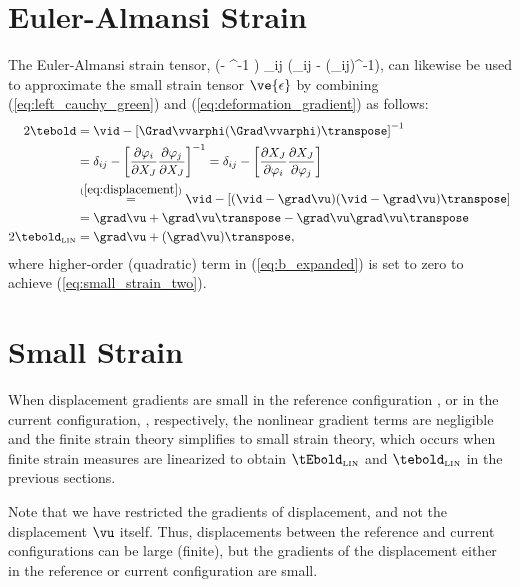 \section{Euler-Almansi Strain}
The Euler-Almansi strain tensor,
\be
 \tebold 
 \half (\vid - \tbbold^{-1} )
 \;\; \Longleftrightarrow \;\;
 \te_{ij} 
 \half \left(\delta_{ij} - (\tb_{ij})^{-1}\right),
\ee
can likewise be used to approximate the small strain tensor
$\ve{\epsilon}$ by combining (\ref{eq:left_cauchy_green}) and
(\ref{eq:deformation_gradient}) as follows:
\begin{align}
 2 \tebold &=
     \vid - \left[ \Grad \vvarphi 
     (\Grad \vvarphi)\transpose \right]^{-1} \nonumber \\
     &= 
     \delta_{ij} 
       - \left[ \frac{\partial \varphi_i}{\partial X_J}
                \frac{\partial \varphi_j}{\partial X_J}
         \right]^{-1} %
     =
      \delta_{ij} 
       - \left[ \frac{\partial X_J}{\partial \varphi_i}
                \frac{\partial X_J}{\partial \varphi_j}
         \right] 
	    \nonumber \\ 
     &\overset{(\ref{eq:displacement})}{=}
      \vid 
       - \left[
                (\vid - \grad \vu) (\vid - \grad \vu)\transpose
         \right]
	   \nonumber \\ 
     &=
     \grad \vu + \grad \vu\transpose - 
     \grad \vu \grad \vu\transpose 
     \label{eq:b_expanded} \\
 2 \tebold_{\tiny \mbox{LIN}} 
     &=
     \grad \vu + (\grad \vu)\transpose,
     \label{eq:small_strain_two}
\end{align}
where higher-order (quadratic) term in (\ref{eq:b_expanded}) is set
to zero to achieve (\ref{eq:small_strain_two}).

\section{Small Strain}
When displacement gradients are small in the reference configuration 
\be
\Grad \vu {},
\ee 
or in the current configuration, 
\be
\grad \vu {},
\ee
respectively, the nonlinear gradient terms 
are negligible and the finite strain theory simplifies to small strain
theory, which occurs when finite strain measures are linearized to 
obtain
$\tEbold_{\tiny \mbox{LIN}}$
and 
$\tebold_{\tiny \mbox{LIN}}$
in the previous sections.

Note that we have restricted the gradients of displacement, and not the
displacement $\vu$ itself.  Thus, displacements between the reference and
current configurations can be large (finite), but the gradients of the
displacement either in the reference or current configuration are small.

